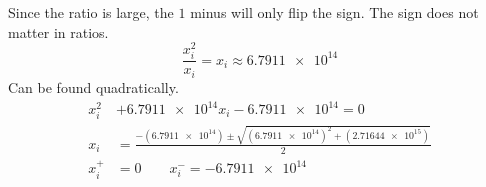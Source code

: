 \documentclass{article}
\begin{document}
		Since the ratio is large, the $1$ minus will only flip the sign. The sign does not matter in ratios.
		\[
			\frac{x^2_i}{x_i} = x_i \approx \num{6.7911e14}
		\]
		Can be found quadratically.
		\begin{equation*}
			\begin{split}
				x^2_i &+ \num{6.7911e14}x_i - \num{6.7911e14}  = 0 \\
				x_i &= \frac{-(\num{6.7911e14}) \pm \sqrt{(\num{6.7911e14})^2 + (\num{2.71644e15})}}{2} \\
				x^+_i &= 0 \qquad x^-_i = \num{-6.7911e14}
			\end{split}
		\end{equation*}
		
		
	
	
	
	\clearpage
	
	
	
\end{document}
